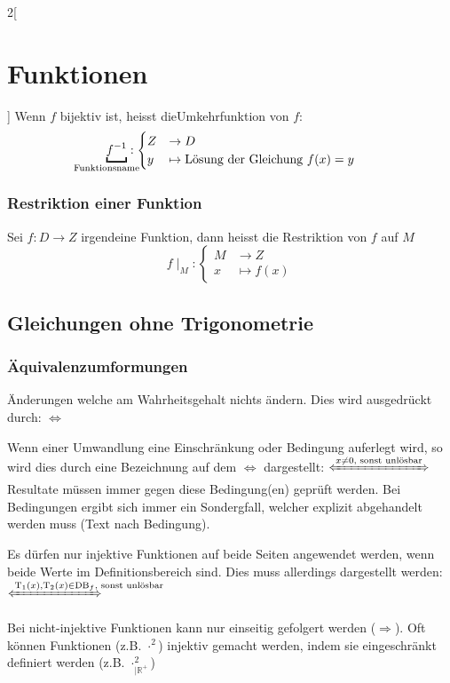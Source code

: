 \begin{multicols}{2}[
	\section{Funktionen}
]
	Wenn $f$ bijektiv ist, heisst die\newline Umkehrfunktion von $f$:
	\[
		\underbracket{f^{-1}}_{\mathclap{\text{Funktionsname\space\space\space\space\space\space}}} : \begin{cases}
			Z &\to D \\
			y &\mapsto \text{Lösung der Gleichung } f(x) = y
		\end{cases}
	\]
	
\subsubsection{Restriktion einer Funktion}

	Sei $f: D \to Z$ irgendeine Funktion, dann heisst die Restriktion von $f$ auf $M$
	\[
		f\mid_M : \begin{cases}
			M &\to Z \\
			x &\mapsto f(x)
		\end{cases}
	\]

\subsection{Gleichungen ohne Trigonometrie}


\subsubsection{Äquivalenzumformungen}
	Änderungen welche am Wahrheitsgehalt nichts ändern. Dies wird ausgedrückt durch: $\Leftrightarrow$
	
	Wenn einer Umwandlung eine Einschränkung oder Bedingung auferlegt wird, so wird dies durch eine Bezeichnung auf dem $\Leftrightarrow$ dargestellt: $\xLeftrightarrow{x \neq 0 \text{, sonst unlösbar}}$
	Resultate müssen immer gegen diese Bedingung(en) geprüft werden.
	Bei Bedingungen ergibt sich immer ein Sondergfall, welcher explizit abgehandelt werden muss (Text nach Bedingung).
	
	Es dürfen nur injektive Funktionen auf beide Seiten angewendet werden, wenn beide Werte im Definitionsbereich sind. Dies muss allerdings dargestellt werden: $\xLeftrightarrow{\text{T}_1(x), \text{T}_2(x) \in \text{DB}_f \mathrlap{\text{, sonst unlösbar}}}$
	
	Bei nicht-injektive Funktionen kann nur einseitig gefolgert werden ($\Rightarrow$). Oft können Funktionen (z.B. $\cdot^2$) injektiv gemacht werden, indem sie eingeschränkt definiert werden (z.B. $\cdot^2_{|\mathbb{R}^+}$)
	

\end{multicols}
